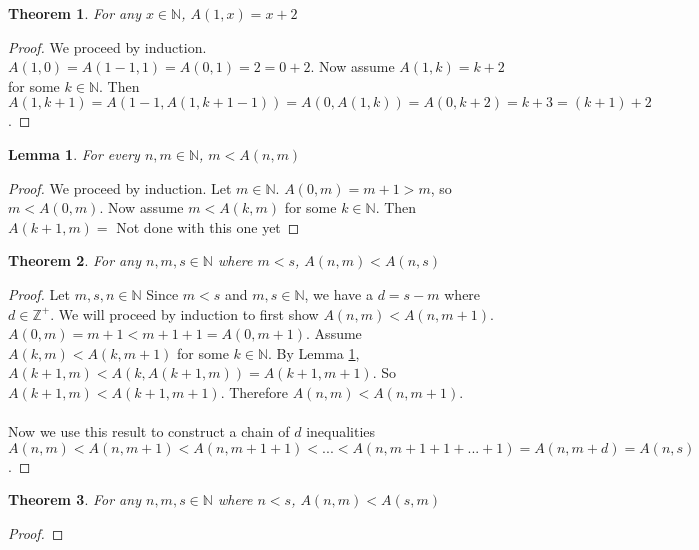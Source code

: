 \documentclass[12pt, letterpaper]{article}
\newtheorem{theorem}{Theorem}
\newtheorem{lemma}{Lemma}
\theoremstyle{case}
\begin{document}
    \begin{theorem}
      \label{x+2=A(1,x)}
      For any $x \in \mathbb{N}$, $A(1, x) = x + 2$
    \end{theorem}
    \begin{proof}
      We proceed by induction. \\
      $A(1, 0) = A(1 - 1, 1) = A(0, 1) = 2 = 0 + 2$. Now assume $A(1, k) = k + 2$ for some $k \in \mathbb{N}$.
      Then $A(1, k + 1) = A(1 - 1, A(1, k + 1 - 1)) = A(0, A(1, k)) = A(0, k + 2) = k + 3 = (k + 1) + 2$.
    \end{proof}

    \begin{lemma}
      \label{m<A(n,m)}
      For every $n, m \in \mathbb{N}$, $m < A(n, m)$
    \end{lemma}
    \begin{proof}
      We proceed by induction.
      Let $m \in \mathbb{N}$.
      $A(0, m) = m + 1 > m$, so $m < A(0, m)$.
      Now assume $m < A(k, m)$ for some $k \in \mathbb{N}$.
      Then $A(k + 1, m) = $
      Not done with this one yet
    \end{proof}

    \begin{theorem}
      \label{a(n,m)<a(n,s)}
      For any $n, m, s \in \mathbb{N}$ where $m < s$, $A(n, m) < A(n, s)$
    \end{theorem}
    \begin{proof}
      Let $m, s, n \in \mathbb{N}$
      Since $m < s$ and $m, s \in \mathbb{N}$, we have a $d = s - m$ where $d \in \mathbb{Z}^+$.
      We will proceed by induction to first show $A(n, m) < A(n, m + 1)$.
      $A(0, m) = m + 1 < m + 1 + 1 = A(0, m + 1)$.
      Assume $A(k, m) < A(k, m + 1)$ for some $k \in \mathbb{N}$.
      By Lemma \ref{m<A(n,m)}, $A(k + 1, m) < A(k, A(k + 1, m)) = A(k + 1, m + 1)$.
      So $A(k + 1, m) < A(k + 1, m + 1)$.
      Therefore $A(n, m) < A(n, m + 1)$.
      \\
      \\
      Now we use this result to construct a chain of $d$ inequalities $A(n, m) < A(n, m + 1) < A(n, m + 1 + 1) < ... < A(n, m + 1 + 1 + ... + 1)
      = A(n, m + d) = A(n, s)$. 
    \end{proof}

    \begin{theorem}
      \label{a(n,m)<a(s,m)}
      For any $n, m, s \in \mathbb{N}$ where $n < s$, $A(n, m) < A(s, m)$
    \end{theorem}
    \begin{proof}
    \end{proof}
\end{document}

